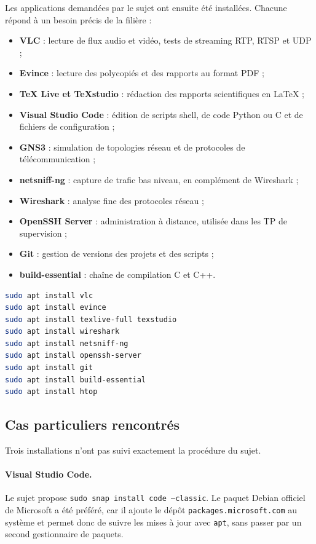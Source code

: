 \documentclass[11pt,a4paper]{article}
\begin{document}
Les applications demand\'ees par le sujet ont ensuite \'et\'e install\'ees. Chacune r\'epond \`a un besoin
pr\'ecis de la fili\`ere :

\begin{itemize}[noitemsep]
    \item \textbf{VLC} : lecture de flux audio et vid\'eo, tests de streaming RTP, RTSP et UDP ;
    \item \textbf{Evince} : lecture des polycopi\'es et des rapports au format PDF ;
    \item \textbf{TeX Live et TeXstudio} : r\'edaction des rapports scientifiques en LaTeX ;
    \item \textbf{Visual Studio Code} : \'edition de scripts shell, de code Python ou C et de fichiers de configuration ;
    \item \textbf{GNS3} : simulation de topologies r\'eseau et de protocoles de t\'el\'ecommunication ;
    \item \textbf{netsniff-ng} : capture de trafic bas niveau, en compl\'ement de Wireshark ;
    \item \textbf{Wireshark} : analyse fine des protocoles r\'eseau ;
    \item \textbf{OpenSSH Server} : administration \`a distance, utilis\'ee dans les TP de supervision ;
    \item \textbf{Git} : gestion de versions des projets et des scripts ;
    \item \textbf{build-essential} : cha\^ine de compilation C et C++.
\end{itemize}

\begin{lstlisting}[language=bash]
sudo apt install vlc
sudo apt install evince
sudo apt install texlive-full texstudio
sudo apt install wireshark
sudo apt install netsniff-ng
sudo apt install openssh-server
sudo apt install git
sudo apt install build-essential
sudo apt install htop
\end{lstlisting}

\subsection{Cas particuliers rencontr\'es}

Trois installations n'ont pas suivi exactement la proc\'edure du sujet.

\paragraph{Visual Studio Code.}
Le sujet propose \texttt{sudo snap install code --classic}. Le paquet Debian officiel de Microsoft a \'et\'e
pr\'ef\'er\'e, car il ajoute le d\'ep\^ot \texttt{packages.microsoft.com} au syst\`eme et permet donc de
suivre les mises \`a jour avec \texttt{apt}, sans passer par un second gestionnaire de paquets.
\end{document}
